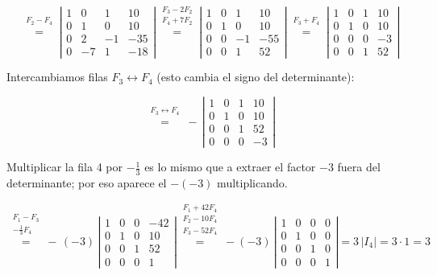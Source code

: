 \documentclass[a4paper,12pt]{article}
\begin{document}
\begin{ejercicio}[title=Ejercicio 32]
\[
\overset{\substack{F_2-F_4\\{}}}{=}
\left|
\begin{matrix}
1 & 0 & 1 & 10\\
0 & 1 & 0 & 10\\
0 & 2 & -1 & -35\\
0 & -7 & 1 & -18
\end{matrix}
\right|
\overset{\substack{F_3-2F_2\\F_4+7F_2\\{}}}{=}
\left|
\begin{matrix}
1 & 0 & 1 & 10\\
0 & 1 & 0 & 10\\
0 & 0 & -1 & -55\\
0 & 0 & 1 & 52
\end{matrix}
\right|
\overset{\substack{F_3+F_4\\{}}}{=}
\left|
\begin{matrix}
1 & 0 & 1 & 10\\
0 & 1 & 0 & 10\\
0 & 0 & 0 & -3\\
0 & 0 & 1 & 52
\end{matrix}
\right|
\]

Intercambiamos filas \(F_3\leftrightarrow F_4\) (esto cambia el signo del determinante):

\[
\overset{\substack{F_3\leftrightarrow F_4\\{}}}{=}
-\,\left|
\begin{matrix}
1 & 0 & 1 & 10\\
0 & 1 & 0 & 10\\
0 & 0 & 1 & 52\\
0 & 0 & 0 & -3
\end{matrix}
\right|
\]
\end{ejercicio}
\begin{ejercicio}[title=Ejercicio 32]
Multiplicar la fila 4 por $-\tfrac{1}{3}$ es lo mismo que a extraer el factor $-3$ fuera del determinante; por eso aparece el $-(-3)$ multiplicando.

\[
\overset{\substack{F_1-F_3\\-\tfrac{1}{3}F_4\\{}}}{=}
-\,(-3)\,
\left|
\begin{matrix}
1 & 0 & 0 & -42\\
0 & 1 & 0 & 10\\
0 & 0 & 1 & 52\\
0 & 0 & 0 & 1
\end{matrix}
\right|
\overset{\substack{F_1+42F_4\\F_2-10F_4\\F_3-52F_4\\{}}}{=}
-(-3)\,
\left|
\begin{matrix}
1 & 0 & 0 & 0\\
0 & 1 & 0 & 0\\
0 & 0 & 1 & 0\\
0 & 0 & 0 & 1
\end{matrix}
\right|
= 3\,\left|I_4\right| = 3\cdot 1 = \boxed{3}
\]
\end{ejercicio}
\end{document}
